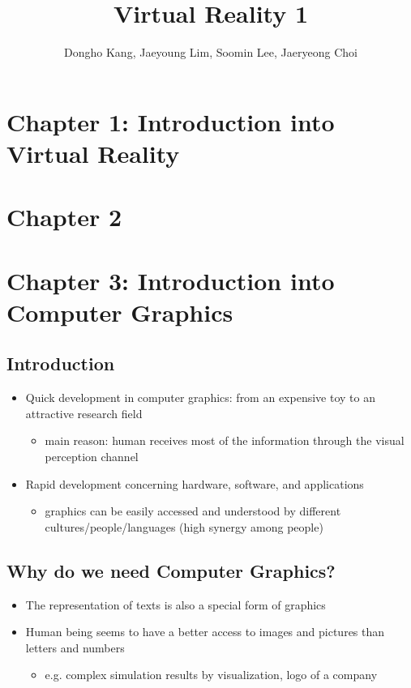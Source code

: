 \documentclass[12pt]{article}
\title{Virtual Reality 1}
\author{Dongho Kang, Jaeyoung Lim, Soomin Lee, Jaeryeong Choi}
\begin{document}
 

\maketitle

\section{Chapter 1: Introduction into Virtual Reality}


\section{Chapter 2}

\newpage
\section{Chapter 3: Introduction into Computer Graphics}

\subsection{Introduction}

\begin{itemize}
	\item Quick development in computer graphics: from an expensive toy to an attractive research field
		\begin{itemize}
			\item main reason: human receives most of the information through the visual perception channel
			\end{itemize}
	\item Rapid development concerning hardware, software, and applications
		\begin{itemize}
			\item graphics can be easily accessed and understood by different cultures/people/languages (high synergy among people)
		\end{itemize}
\end{itemize}

\subsection{Why do we need Computer Graphics?}

\begin{itemize}
	\item The representation of texts is also a special form of graphics
	\item Human being seems to have a better access to images and pictures than letters and numbers
		\begin{itemize}
			\item e.g. complex simulation results by visualization, logo of a company
		\end{itemize}
\end{itemize}
\end{document}

